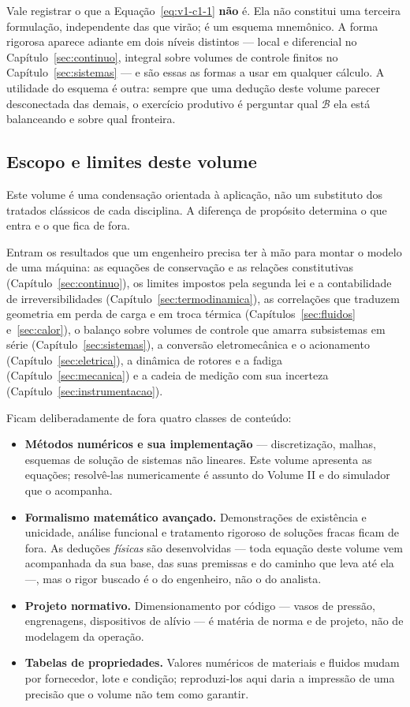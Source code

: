 \documentclass[12pt,a4paper]{article}
\numberwithin{equation}{section}
\numberwithin{table}{section}
\numberwithin{figure}{section}
\begin{document}
Vale registrar o que a Equação~\eqref{eq:v1-c1-1} \textbf{não} é. Ela não
constitui uma terceira formulação, independente das que virão; é um esquema
mnemônico. A forma rigorosa aparece adiante em dois níveis distintos ---
local e diferencial no Capítulo~\ref{sec:continuo}, integral sobre volumes de
controle finitos no Capítulo~\ref{sec:sistemas} --- e são essas as formas a
usar em qualquer cálculo. A utilidade do esquema é outra: sempre que uma
dedução deste volume parecer desconectada das demais, o exercício produtivo é
perguntar qual $\mathcal{B}$ ela está balanceando e sobre qual fronteira.

\subsection{Escopo e limites deste volume}

Este volume é uma condensação orientada à aplicação, não um substituto dos
tratados clássicos de cada disciplina. A diferença de propósito determina o
que entra e o que fica de fora.

Entram os resultados que um engenheiro precisa ter à mão para montar o modelo
de uma máquina: as equações de conservação e as relações constitutivas
(Capítulo~\ref{sec:continuo}), os limites impostos pela segunda lei e a
contabilidade de irreversibilidades (Capítulo~\ref{sec:termodinamica}), as
correlações que traduzem geometria em perda de carga e em troca térmica
(Capítulos~\ref{sec:fluidos} e~\ref{sec:calor}), o balanço sobre volumes de
controle que amarra subsistemas em série (Capítulo~\ref{sec:sistemas}), a
conversão eletromecânica e o acionamento (Capítulo~\ref{sec:eletrica}), a
dinâmica de rotores e a fadiga (Capítulo~\ref{sec:mecanica}) e a cadeia de
medição com sua incerteza (Capítulo~\ref{sec:instrumentacao}).

Ficam deliberadamente de fora quatro classes de conteúdo:

\begin{itemize}
	\item \textbf{Métodos numéricos e sua implementação} --- discretização,
	malhas, esquemas de solução de sistemas não lineares. Este volume apresenta
	as equações; resolvê-las numericamente é assunto do Volume II e do
	simulador que o acompanha.
	\item \textbf{Formalismo matemático avançado.} Demonstrações de
	existência e unicidade, análise funcional e tratamento rigoroso de soluções
	fracas ficam de fora. As deduções \emph{físicas} são desenvolvidas --- toda
	equação deste volume vem acompanhada da sua base, das suas premissas e do
	caminho que leva até ela ---, mas o rigor buscado é o do engenheiro, não o
	do analista.
	\item \textbf{Projeto normativo.} Dimensionamento por código --- vasos de
	pressão, engrenagens, dispositivos de alívio --- é matéria de norma e de
	projeto, não de modelagem da operação.
	\item \textbf{Tabelas de propriedades.} Valores numéricos de materiais e
	fluidos mudam por fornecedor, lote e condição; reproduzi-los aqui daria a
	impressão de uma precisão que o volume não tem como garantir.
\end{itemize}
\end{document}
